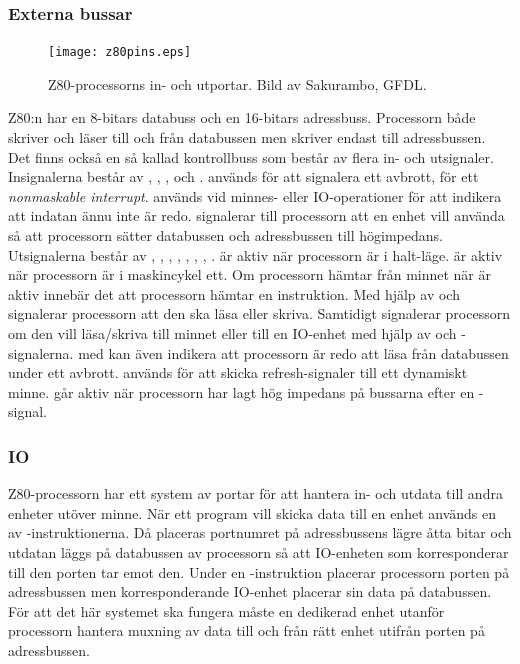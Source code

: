 \documentclass[main.tex]{subfiles}
\begin{document}
\subsubsection{Externa bussar}
\begin{figure}
    \centering
    \vspace{-5mm}
    \texttt{[image: z80pins.eps]}
    \caption{Z80-processorns in- och utportar. Bild av Sakurambo, GFDL.}
    \label{fig:z80pins}
\end{figure}
Z80:n har en 8-bitars databuss och en 16-bitars adressbuss. Processorn både
skriver och läser till och från databussen men skriver endast till
adressbussen. Det finns också en så kallad kontrollbuss som består av flera in-
och utsignaler. Insignalerna består av , , ,
 och .  används för att signalera ett
avbrott,  för ett {\it nonmaskable interrupt}.  används
vid minnes- eller IO-operationer för att indikera att indatan ännu inte är
redo.  signalerar till processorn att en enhet vill använda så att
processorn sätter databussen och adressbussen till högimpedans. Utsignalerna
består av , , , , ,
, , .  är aktiv när processorn är i
halt-läge.  är aktiv när processorn är i maskincykel ett. Om
processorn hämtar från minnet när  är aktiv innebär det att processorn
hämtar en instruktion. Med hjälp av  och  signalerar
processorn att den ska läsa eller skriva. Samtidigt signalerar processorn om
den vill läsa/skriva till minnet eller till en IO-enhet med hjälp av
 och -signalerna.  med  kan även
indikera att processorn är redo att läsa från databussen under ett avbrott.
 används för att skicka refresh-signaler till ett dynamiskt minne.
 går aktiv när processorn har lagt hög impedans på bussarna efter
en -signal.

\subsubsection{IO}
Z80-processorn har ett system av portar för att hantera in- och utdata till
andra enheter utöver minne. När ett program vill skicka data till en enhet
används en av -instruktionerna. Då placeras portnumret på
adressbussens lägre åtta bitar och utdatan läggs på databussen av processorn så
att IO-enheten som korresponderar till den porten tar emot den. Under en
-instruktion placerar processorn porten på adressbussen men
korresponderande IO-enhet placerar sin data på databussen. För att det här
systemet ska fungera måste en dedikerad enhet utanför processorn hantera
muxning av data till och från rätt enhet utifrån porten på adressbussen.
\end{document}
